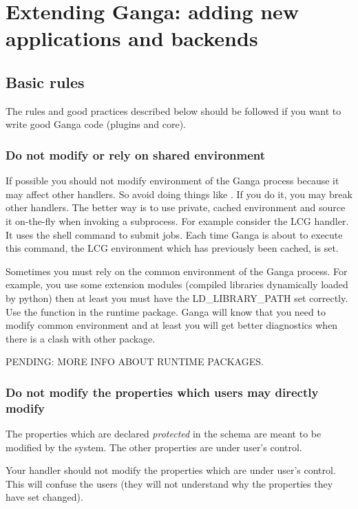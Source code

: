 \documentclass{howto}
\begin{document}
\section{Extending Ganga: adding new applications and backends}

\subsection{Basic rules}

The rules and good practices described below should be followed if you
want to write good Ganga code (plugins and core).

\subsubsection{Do not modify or rely on shared environment}

If possible  you should  not modify environment  of the  Ganga process
because  it may  affect other  handlers.  So avoid  doing things  like
.  If you do it, you may break other
handlers. The  better way  is to use  private, cached  environment and
source it on-the-fly when  invoking a subprocess. For example consider
the LCG  handler. It uses  the  shell  command to
submit jobs. Each time Ganga is about to execute this command, the LCG
environment which has previously been cached, is set.

Sometimes  you  must rely  on  the  common  environment of  the  Ganga
process.  For  example,  you  use  some  extension  modules  (compiled
libraries dynamically  loaded by python)  then at least you  must have
the  LD_LIBRARY_PATH set  correctly.  Use the  
function  in the runtime  package. Ganga  will know  that you  need to
modify common environment and at least you will get better diagnostics
when there is a clash with other package.

PENDING: MORE INFO ABOUT RUNTIME PACKAGES.

\subsubsection{Do not modify the properties which users may directly modify}

The properties which  are declared {\em protected }  in the schema are
meant to  be modified by  the system. The  other properties are under 
user's control.

Your handler should  not modify the properties which  are under user's
control.  This  will confuse the  users (they will not  understand why
the properties they have set changed).
\end{document}
